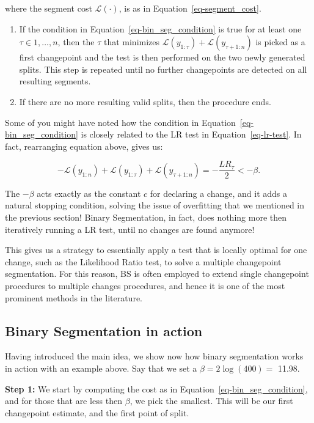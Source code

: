 \documentclass[
  letterpaper,
  DIV=11,
  numbers=noendperiod]{scrreprt}
\begin{document}
where the segment cost \(\mathcal{L}(\cdot)\), is as in
Equation~\ref{eq-segment_cost}.

\begin{enumerate}
\def\labelenumi{\arabic{enumi}.}
\setcounter{enumi}{1}
\item
  If the condition in Equation~\ref{eq-bin_seg_condition} is true for at
  least one \(\tau \in 1, \dots, n\), then the \(\tau\) that minimizes
  \(\mathcal{L}(y_{1:\tau}) + \mathcal{L}(y_{\tau+1:n})\) is picked as a
  first changepoint and the test is then performed on the two newly
  generated splits. This step is repeated until no further changepoints
  are detected on all resulting segments.
\item
  If there are no more resulting valid splits, then the procedure ends.
\end{enumerate}

Some of you might have noted how the condition in
Equation~\ref{eq-bin_seg_condition} is closely related to the LR test in
Equation~\ref{eq-lr-test}. In fact, rearranging equation above, gives
us:

\[
- \mathcal{L}(y_{1:n}) + \mathcal{L}(y_{1:\tau}) + \mathcal{L}(y_{\tau+1:n}) = - \frac{LR_\tau}{2}  < -\beta.
\]

The \(-\beta\) acts exactly as the constant \(c\) for declaring a
change, and it adds a natural stopping condition, solving the issue of
overfitting that we mentioned in the previous section! Binary
Segmentation, in fact, does nothing more then iteratively running a LR
test, until no changes are found anymore!

This gives us a strategy to essentially apply a test that is locally
optimal for one change, such as the Likelihood Ratio test, to solve a
multiple changepoint segmentation. For this reason, BS is often employed
to extend single changepoint procedures to multiple changes procedures,
and hence it is one of the most prominent methods in the literature.

\subsection{Binary Segmentation in
action}\label{binary-segmentation-in-action}

Having introduced the main idea, we show now how binary segmentation
works in action with an example above. Say that we set a
\(\beta = 2 \log(400) =\) 11.98.

\textbf{Step 1:} We start by computing the cost as in
Equation~\ref{eq-bin_seg_condition}, and for those that are less then
\(\beta\), we pick the smallest. This will be our first changepoint
estimate, and the first point of split.
\end{document}
